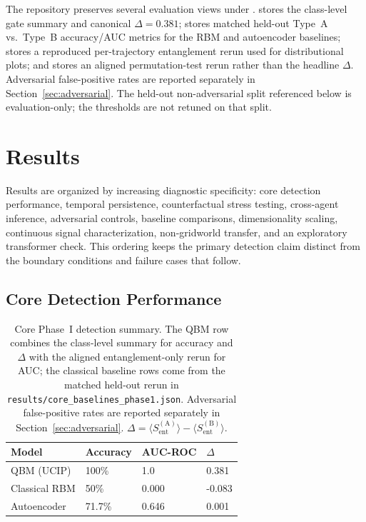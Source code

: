 \documentclass[11pt]{article}
\begin{document}
	The repository preserves several evaluation views under
	.  stores the class-level
	gate summary and canonical $\Delta = 0.381$;
	 stores matched held-out Type~A vs.\ Type~B
	accuracy/AUC metrics for the RBM and autoencoder baselines;
	 stores a reproduced
	per-trajectory entanglement rerun used for distributional plots; and
	 stores an aligned permutation-test rerun rather than
	the headline $\Delta$. Adversarial false-positive rates are reported
	separately in Section~\ref{sec:adversarial}. The held-out
	non-adversarial split referenced below is evaluation-only; the
	thresholds are not retuned on that split.
	
	\section{Results}\label{sec:results}
	
	Results are organized by increasing diagnostic specificity: core detection
	performance, temporal persistence, counterfactual stress testing, cross-agent
	inference, adversarial controls, baseline comparisons, dimensionality scaling,
	continuous signal characterization, non-gridworld transfer, and an
	exploratory transformer check. This ordering keeps the primary detection claim
	distinct from the boundary conditions and failure cases that follow.
	
	\subsection{Core Detection Performance}\label{sec:core_detection}
	
	\begin{table}[t]
		\centering
		\caption{Core Phase~I detection summary. The QBM row combines the
			class-level summary for accuracy and $\Delta$ with the aligned
			entanglement-only rerun for AUC; the classical baseline rows come from the
			matched held-out rerun in \texttt{results/core\_baselines\_phase1.json}.
			Adversarial false-positive rates are reported separately in
			Section~\ref{sec:adversarial}. $\Delta = \langle S_\mathrm{ent}^\mathrm{(A)}\rangle - \langle S_\mathrm{ent}^\mathrm{(B)}\rangle$.}
		\label{tab:core_results}
		\begin{tabular}{llll}
			\toprule
			Model & Accuracy & AUC-ROC & $\Delta$ \\
			\midrule
			QBM (UCIP) & 100\% & 1.0 & 0.381 \\
			Classical RBM & 50\% & 0.000 & -0.083 \\
			Autoencoder & 71.7\% & 0.646 & 0.001 \\
			\bottomrule
		\end{tabular}
	\end{table}
	
\end{document}
